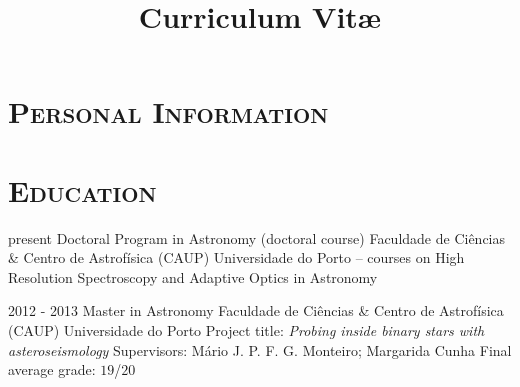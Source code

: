 \documentclass[10pt]{moderncv}
\title{Curriculum Vit\ae{}}
\begin{document}
\maketitle

\section{\textsc{Personal Information}}





\section{\textsc{Education}}

\cventry
	{present}
	{Doctoral Program in Astronomy (doctoral course)}
	{\newline Faculdade de Ciências \& Centro de Astrofísica (CAUP)}
	{Universidade do Porto}
	{\newline 
	-- courses on High Resolution Spectroscopy and Adaptive Optics in Astronomy}
	{}  %


\cventry
	{2012 - 2013}
	{Master in Astronomy}
	{\newline Faculdade de Ciências \& Centro de Astrofísica (CAUP)}
	{Universidade do Porto}
	{\newline Project title: \emph{Probing inside binary stars with asteroseismology}
	\newline
	Supervisors: Mário J. P. F. G. Monteiro; Margarida Cunha}
	{Final average grade: $19$/$20$}  %


\end{document}
